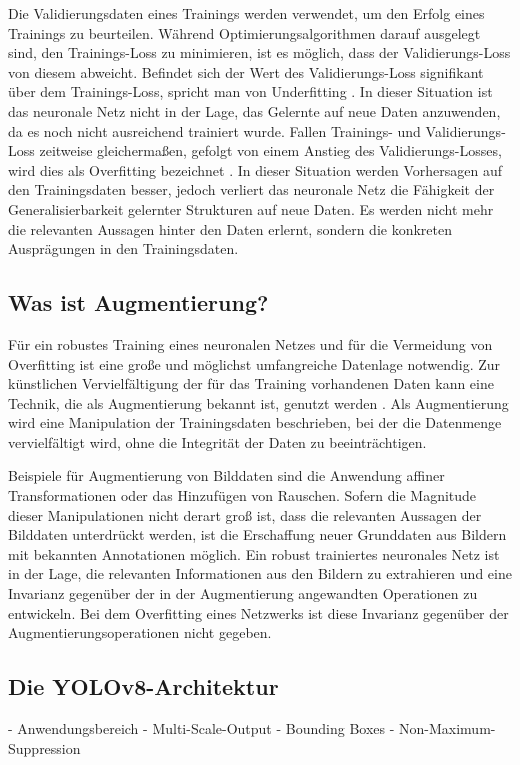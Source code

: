 Die Validierungsdaten eines Trainings werden verwendet, um den Erfolg eines Trainings zu beurteilen. Während Optimierungsalgorithmen darauf ausgelegt sind, den Trainings-Loss zu minimieren, ist es möglich, dass der Validierungs-Loss von diesem abweicht. Befindet sich der Wert des Validierungs-Loss signifikant über dem Trainings-Loss, spricht man von Underfitting \cite{nn_terminology,cv_general}. In dieser Situation ist das neuronale Netz nicht in der Lage, das Gelernte auf neue Daten anzuwenden, da es noch nicht ausreichend trainiert wurde. Fallen Trainings- und Validierungs-Loss zeitweise gleichermaßen, gefolgt von einem Anstieg des Validierungs-Losses, wird dies als Overfitting bezeichnet \cite{cv_general}. In dieser Situation werden Vorhersagen auf den Trainingsdaten besser, jedoch verliert das neuronale Netz die Fähigkeit der Generalisierbarkeit gelernter Strukturen auf neue Daten. Es werden nicht mehr die relevanten Aussagen hinter den Daten erlernt, sondern die konkreten Ausprägungen in den Trainingsdaten.


\subsection{Was ist Augmentierung?}
\label{sec:was_augmentierung}

Für ein robustes Training eines neuronalen Netzes und für die Vermeidung von Overfitting ist eine große und möglichst umfangreiche Datenlage notwendig. Zur künstlichen Vervielfältigung der für das Training vorhandenen Daten kann eine Technik, die als Augmentierung bekannt ist, genutzt werden \cite{cv_general}. Als Augmentierung wird eine Manipulation der Trainingsdaten beschrieben, bei der die Datenmenge vervielfältigt wird, ohne die Integrität der Daten zu beeinträchtigen. 

Beispiele für Augmentierung von Bilddaten sind die Anwendung affiner Transformationen oder das Hinzufügen von Rauschen. Sofern die Magnitude dieser Manipulationen nicht derart groß ist, dass die relevanten Aussagen der Bilddaten unterdrückt werden, ist die Erschaffung neuer Grunddaten aus Bildern mit bekannten Annotationen möglich. Ein robust trainiertes neuronales Netz ist in der Lage, die relevanten Informationen aus den Bildern zu extrahieren und eine Invarianz gegenüber der in der Augmentierung angewandten Operationen zu entwickeln. Bei dem Overfitting eines Netzwerks ist diese Invarianz gegenüber der Augmentierungsoperationen nicht gegeben.


\subsection{Die YOLOv8-Architektur}
\label{sec:was_yolov8}

- Anwendungsbereich
- Multi-Scale-Output
- Bounding Boxes
- Non-Maximum-Suppression



